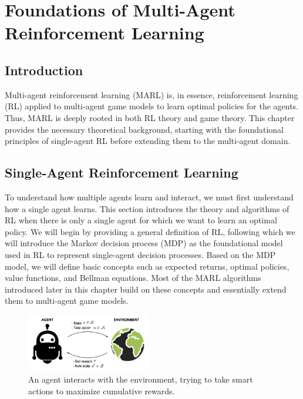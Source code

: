 \chapter{Foundations of Multi-Agent Reinforcement Learning}

\section*{Introduction}
Multi-agent reinforcement learning (MARL) is, in essence, reinforcement learning (RL) applied to multi-agent game models to learn optimal policies for the agents. Thus, MARL is deeply rooted in both RL theory and game theory. This chapter provides the necessary theoretical background, starting with the foundational principles of single-agent RL before extending them to the multi-agent domain.

\section{Single-Agent Reinforcement Learning}
To understand how multiple agents learn and interact, we must first understand how a single agent learns. This section introduces the theory and algorithms of RL when there is only a single agent for which we want to learn an optimal policy. We will begin by providing a general definition of RL, following which we will introduce the Markov decision process (MDP) as the foundational model used in RL to represent single-agent decision processes. Based on the MDP model, we will define basic concepts such as expected returns, optimal policies, value functions, and Bellman equations. Most of the MARL algorithms introduced later in this chapter build on these concepts and essentially extend them to multi-agent game models.
\begin{figure}[!ht]
    \centering
     \includegraphics[width=0.48\textwidth]{img_pfe/RL_illustration.png}
    \caption{An agent interacts with the environment, trying to take smart actions to maximize cumulative rewards.}
    \label{fig:rl}
\end{figure}

